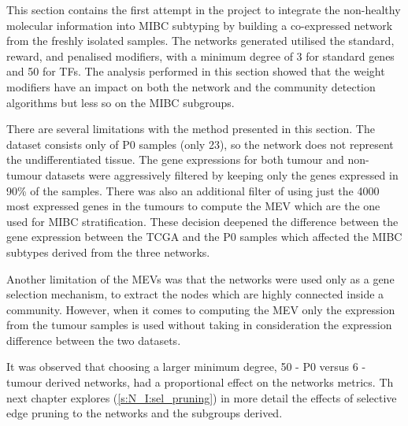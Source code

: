 This section contains the first attempt in the project to integrate the non-healthy molecular information into MIBC subtyping by building a co-expressed network from the freshly isolated samples. The networks generated utilised the standard, reward, and penalised modifiers, with a minimum degree of 3 for standard genes and 50 for TFs. The analysis performed in this section showed that the weight modifiers have an impact on both the network and the community detection algorithms but less so on the MIBC subgroups. 

There are several limitations with the method presented in this section. The dataset consists only of P0 samples (only 23), so the network does not represent the undifferentiated tissue. The gene expressions for both tumour and non-tumour datasets were aggressively filtered by keeping only the genes expressed in 90\% of the samples. There was also an additional filter of using just the 4000 most expressed genes in the tumours to compute the MEV which are the one used for MIBC stratification. These decision deepened the difference between the gene expression between the TCGA and the P0 samples which affected the MIBC subtypes derived from the three networks.

Another limitation of the MEVs was that the networks were used only as a gene selection mechanism, to extract the nodes which are highly connected inside a community. However, when it comes to computing the MEV only the expression from the tumour samples is used without taking in consideration the expression difference between the two datasets.

It was observed that choosing a larger minimum degree, 50 - P0 versus 6 - tumour derived networks, had a proportional effect on the networks metrics. Th next chapter explores (\cref{s:N_I:sel_pruning}) in more detail the effects of selective edge pruning to the networks and the subgroups derived. 







